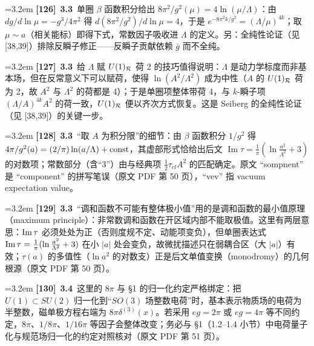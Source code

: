 \par
\par\medskip\noindent\hangindent=3.2em \textbf{[126]}~\textbf{3.3}~单圈 $\beta$ 函数积分给出 $8\pi^2/g^2(\mu)=4\ln(\mu/\Lambda)$：由 $dg/d\ln\mu=-g^3/4\pi^2$ 得 $d(8\pi^2/g^2)/d\ln\mu=4$，于是 $e^{-8\pi^2k/g^2}=(\Lambda/\mu)^{4k}$；取 $\mu\sim a$（相关能标）即得下式，常数因子吸收进 $\Lambda$ 的定义。另：全纯性论证（见 [38,39]）排除反瞬子修正——反瞬子贡献依赖 $\bar g$ 而不全纯。
\par
\par\medskip\noindent\hangindent=3.2em \textbf{[127]}~\textbf{3.3}~给 $\Lambda$ 赋 $U(1)_{\cal R}$ 荷 2 的技巧值得说明：$\Lambda$ 是动力学标度而非基本场，但在反常意义下可以赋荷，使得 $\ln(A^2/\Lambda^2)$ 成为中性（$A$ 的 $U(1)_{\cal R}$ 荷为 2，故 $A^2$ 与 $\Lambda^2$ 的荷都是 4）；于是单圈项整体带荷 4，与 $k$-瞬子项 $(\Lambda/A)^{4k}A^2$ 的荷一致，$U(1)_{\cal R}$ 便以齐次方式恢复。这是 Seiberg 的全纯性论证（见 [38,39]）的关键一步。
\par
\par\medskip\noindent\hangindent=3.2em \textbf{[128]}~\textbf{3.3}~“取 $A$ 为积分限”的细节：由 $\beta$ 函数积分 $1/g^2$ 得 $4\pi/g^2(a)=(2/\pi)\ln(a/\Lambda)+{\rm const}$，其虚部形式恰给出后文 $\operatorname{Im}\tau=\frac1\pi(\ln\frac{a^2}{\Lambda^2}+3)$ 的对数项；常数部分（含“3”）由与经典项 $\frac12\tau_{cl}A^2$ 的匹配确定。原文 “sompnent” 是 “component” 的拼写笔误（原文 PDF 第 50 页），“vev” 指 vacuum expectation value。
\par
\par\medskip\noindent\hangindent=3.2em \textbf{[129]}~\textbf{3.3}~“调和函数不可能有整体极小值”用的是调和函数的最小值原理（maximum principle）：非常数调和函数在开区域内部不能取极值。这里有两层意思：${\rm Im}\,\tau$ 必须处处为正（否则度规不定、动能项变负），但单圈表达式 ${\rm Im}\,\tau=\frac1\pi(\ln\frac{a^2}{\Lambda^2}+3)$ 在小 $|a|$ 处会变负，故微扰描述只在弱耦合区（大 $|a|$）有效；$\tau(a)$ 的多值性（$\ln a^2$ 的对数支）正是后文单值变换（monodromy）的几何根源（原文 PDF 第 50 页）。
\par
\par\medskip\noindent\hangindent=3.2em \textbf{[130]}~\textbf{3.4}~这里的 $8\pi$ 与 §1 的归一化约定严格绑定：把 $U(1)\subset SU(2)$ 归一化到“$SO(3)$ 场整数电荷”时，基本表示物质场的电荷为半整数，磁单极方程右端为 $8\pi\delta^{(3)}(x)$。若采用 $eg=2\pi$ 或 $eg=4\pi$ 等不同约定，$8\pi$、$1/8\pi$、$1/16\pi$ 等因子会整体改变；务必与 §1（1.2--1.4 小节）中电荷量子化与规范场归一化的约定对照核对（原文 PDF 第 51 页）。
